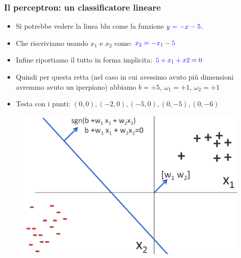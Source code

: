 \begin{frame}
	
	\frametitle{Il perceptron: un classificatore lineare}
	
	\begin{itemize}
		\item<1-5> Si potrebbe vedere la linea blu come la funzione $\textcolor{blue}{y = -x -5}$.
		\item<2-5> Che riscriviamo usando $x_1$ e $x_2$ come: $\textcolor{blue}{x_2 = -x_1 - 5}$
		\item<3-5> Infine riportiamo il tutto in forma implicita: $\textcolor{blue}{5 + x_1 + x2 = 0}$
		\item<4-5> Quindi per questa retta (nel caso in cui avessimo avuto più dimensioni avremmo avuto un iperpiano) abbiamo $b = +5$, $\omega_1 = +1$, $\omega_2 = +1$
		\item<5> Testa con i punti: $(0,0), (-2,0), (-5,0), (0,-5), (0,-6)$
	\end{itemize}
	
		\begin{figure}[!htbp] 
			\centering
			\includegraphics[width=0.55\linewidth]{images/supervised/perceptron/linear_classifier_2.png}
		\end{figure}

\end{frame}


